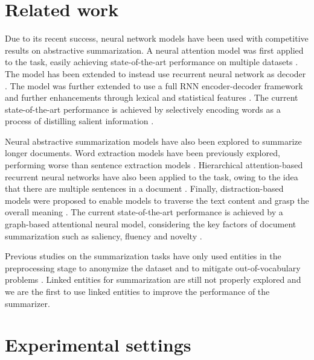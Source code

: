 \documentclass[11pt,a4paper]{article}
\begin{document}
\section{Related work}



Due to its recent success, neural network models have been used with competitive results on abstractive summarization. A neural attention model was first applied to the task, easily achieving state-of-the-art performance on multiple datasets \cite{rush2015neural}. The model has been extended to instead use recurrent neural network as decoder \cite{chopra2016abstractive}. The model was further extended to use a full RNN encoder-decoder framework and further enhancements through lexical and statistical features \cite{nallapati2016abstractive}. The current state-of-the-art performance is achieved by selectively encoding words as a process of distilling salient information \cite{zhou2017selective}.

Neural abstractive summarization models have also been explored to summarize longer documents. Word extraction models
have been previously explored, performing worse than sentence extraction models \cite{cheng2016neural}. Hierarchical attention-based recurrent neural networks have also been applied to the task, owing to the idea that there are multiple sentences in a document \cite{nallapati2016abstractive}. Finally, distraction-based models were proposed to enable models to traverse the text content and grasp the overall meaning \cite{chen2016distraction}. The current state-of-the-art performance is achieved by a graph-based attentional neural model, considering the key factors of document summarization such as saliency, fluency and novelty \cite{tan2017abstractive}.







Previous studies on the summarization tasks have only used entities in the preprocessing stage to anonymize the dataset \cite{nallapati2016abstractive} and to mitigate out-of-vocabulary problems \cite{tan2017abstractive}.
Linked entities for summarization are still not properly explored and we are the first to use linked entities to improve the performance of the summarizer.

\section{Experimental settings}
\label{sec:exp}
\end{document}
